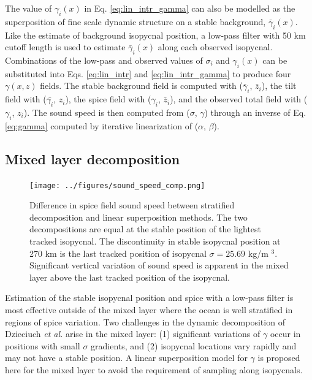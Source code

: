 \documentclass[preprint,NumberedRefs]{JASA}
\begin{document}
The value of $\gamma_i(x)$ in Eq. \eqref{eq:lin_intr_gamma} can also be modelled as the superposition of fine scale dynamic structure on a stable background, $\bar{\gamma}_i(x)$. Like the estimate of background isopycnal position, a low-pass filter with 50 km cutoff length is used to estimate $\bar{\gamma}_i(x)$ along each observed isopycnal. Combinations of the low-pass and observed values of $\sigma_i$ and $\gamma_i(x)$ can be substituted into Eqs. \eqref{eq:lin_intr} and \eqref{eq:lin_intr_gamma} to produce four $\gamma(x,z)$ fields. The stable background field is computed with ($\bar{\gamma}_i$, $\bar{z}_i$), the tilt field with ($\bar{\gamma_i}$, $z_i$), the spice field with ($\gamma_i$, $\bar{z}_i$), and the observed total field with ($\gamma_i$, $z_i$). The sound speed is then computed from ($\sigma$, $\gamma$) through an inverse of Eq. \eqref{eq:gamma} computed by iterative linearization of ($\alpha$, $\beta$).


\subsection{Mixed layer decomposition}
\begin{figure}
\texttt{[image: ../figures/sound\_speed\_comp.png]}
    \caption{\label{fig:c_diff}{Difference in spice field sound speed between stratified decomposition and linear superposition methods. The two decompositions are equal at the stable position of the lightest tracked isopycnal. The discontinuity in stable isopycnal position at 270 km is the last tracked position of isopycnal $\sigma=25.69$ kg/m $^3$. Significant vertical variation of sound speed is apparent in the mixed layer above the last tracked position of the isopycnal.}}
\end{figure}

Estimation of the stable isopycnal position and spice with a low-pass filter is most effective outside of the mixed layer where the ocean is well stratified in regions of spice variation. Two challenges in the dynamic decomposition of Dzieciuch \emph{et al.}\citep{dzieciuch2004} arise in the mixed layer: (1) significant variations of $\gamma$ occur in positions with small $\sigma$ gradients, and (2) isopycnal locations vary rapidly and may not have a stable position. A linear superposition model for $\gamma$ is proposed here for the mixed layer to avoid the requirement of sampling along isopycnals.
\end{document}
